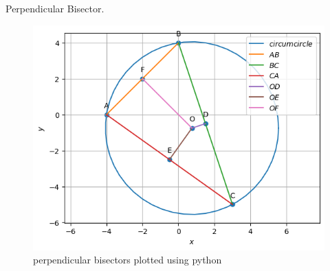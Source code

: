 \begin{table}[H]
        \centering
        
        \caption{Perpendicular Bisector.}
        \label{tab:perp_bisec}
    \end{table}
\begin{figure}[H]
\includegraphics[width=\columnwidth]{perp_bisec/figs/perp_bisec.png}
\caption{perpendicular bisectors plotted using python}
\label{fig:i_perp_bisec_py}
\end{figure}

